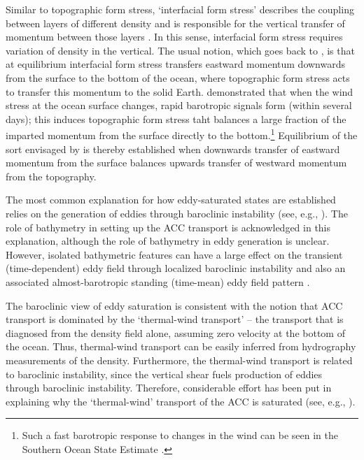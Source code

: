 \documentclass{agujournal2019}
\begin{document}
Similar to topographic form stress, `interfacial form stress' describes the coupling between layers of different density and is responsible for the vertical transfer of momentum between those layers \cite{Johnson-Bryden-1989,Olbers-etal-2004,Ward-Hogg-2011}. In this sense, interfacial form stress requires variation of density in the vertical. The usual notion, which goes back to , is that at equilibrium interfacial form stress transfers eastward momentum downwards from the surface to the bottom of the ocean, where topographic form stress acts to transfer this momentum to the solid Earth.  demonstrated that when the wind stress at the ocean surface changes, rapid barotropic signals form (within several days); this induces topographic form stress taht balances a large fraction of the imparted momentum from the surface directly to the bottom.\footnote{Such a fast barotropic response to changes in the wind can be seen in the Southern Ocean State Estimate \cite{Masich-etal-2015}.} Equilibrium of the sort envisaged by  is thereby established when downwards transfer of eastward momentum from the surface balances upwards transfer of westward momentum from the topography.


The most common explanation for how eddy-saturated states are established relies on the generation of eddies through baroclinic instability (see, e.g., ). The role of bathymetry in setting up the ACC transport is acknowledged in this explanation, although the role of bathymetry in eddy generation is unclear. However, isolated bathymetric features can have a large effect on the transient (time-dependent) eddy field through localized  baroclinic instability and also an associated almost-barotropic standing (time-mean) eddy field pattern \cite{Abernathey-Cessi-2014}. 


The baroclinic view of eddy saturation is consistent with the notion that ACC transport is dominated by the `thermal-wind transport' -- the transport that is diagnosed from the density field alone, assuming zero velocity at the bottom of the ocean. Thus, thermal-wind transport can be easily inferred from hydrography measurements of the density. Furthermore, the thermal-wind transport is related to baroclinic instability, since the vertical shear  fuels production of eddies through baroclinic instability. Therefore, considerable effort has been put in explaining why the `thermal-wind' transport of the ACC is saturated (see, e.g., ).
\end{document}
